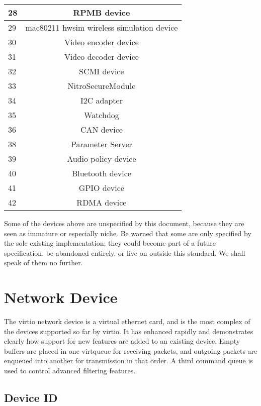 \begin{tabular} { |l|c| }
\hline
28         &   RPMB device \\
\hline
29         &   mac80211 hwsim wireless simulation device \\
\hline
30         &   Video encoder device \\
\hline
31         &   Video decoder device \\
\hline
32         &   SCMI device \\
\hline
33         &   NitroSecureModule \\
\hline
34         &   I2C adapter \\
\hline
35         &   Watchdog \\
\hline
36         &   CAN device \\
\hline
38         &   Parameter Server \\
\hline
39         &   Audio policy device \\
\hline
40         &   Bluetooth device \\
\hline
41         &   GPIO device \\
\hline
42         &   RDMA device \\
\hline
\end{tabular}

Some of the devices above are unspecified by this document,
because they are seen as immature or especially niche.  Be warned
that some are only specified by the sole existing implementation;
they could become part of a future specification, be abandoned
entirely, or live on outside this standard.  We shall speak of
them no further.

\section{Network Device}\label{sec:Device Types / Network Device}

The virtio network device is a virtual ethernet card, and is the
most complex of the devices supported so far by virtio. It has
enhanced rapidly and demonstrates clearly how support for new
features are added to an existing device. Empty buffers are
placed in one virtqueue for receiving packets, and outgoing
packets are enqueued into another for transmission in that order.
A third command queue is used to control advanced filtering
features.

\subsection{Device ID}\label{sec:Device Types / Network Device / Device ID}

